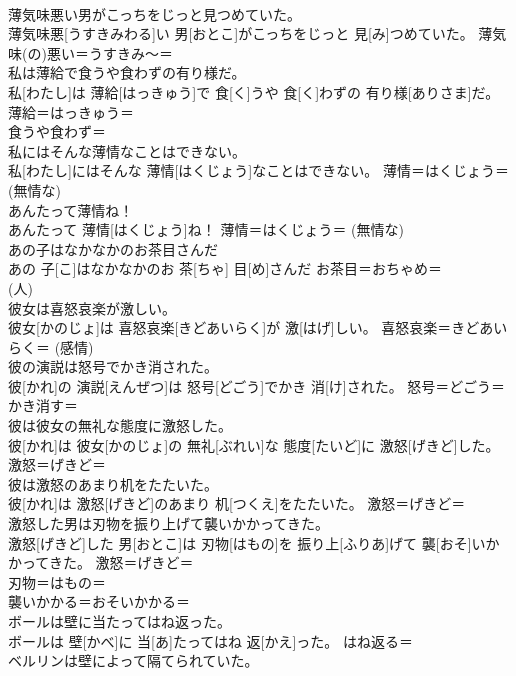 \documentclass[8pt]{extreport}
\begin{document}
\begin{CJK}{UTF8}{min}
{\\	薄気味悪い男がこっちをじっと見つめていた。	
\\	薄気味悪[うすきみわる]い 男[おとこ]がこっちをじっと 見[み]つめていた。	薄気味(の)悪い＝うすきみ〜＝ 
\\	私は薄給で食うや食わずの有り様だ。	
\\	私[わたし]は 薄給[はっきゅう]で 食[く]うや 食[く]わずの 有り様[ありさま]だ。	薄給＝はっきゅう＝ 
\\	食うや食わず＝ 
\\	私にはそんな薄情なことはできない。	
\\	私[わたし]にはそんな 薄情[はくじょう]なことはできない。	薄情＝はくじょう＝ (無情な) 
\\	あんたって薄情ね！	
\\	あんたって 薄情[はくじょう]ね！	薄情＝はくじょう＝ (無情な) 
\\	あの子はなかなかのお茶目さんだ	
\\	あの 子[こ]はなかなかのお 茶[ちゃ] 目[め]さんだ	お茶目＝おちゃめ＝ 
\\	(人) 
\\	彼女は喜怒哀楽が激しい。	
\\	彼女[かのじょ]は 喜怒哀楽[きどあいらく]が 激[はげ]しい。	喜怒哀楽＝きどあいらく＝ (感情) 
\\	彼の演説は怒号でかき消された。	
\\	彼[かれ]の 演説[えんぜつ]は 怒号[どごう]でかき 消[け]された。	怒号＝どごう＝ 
\\	かき消す＝ 
\\	彼は彼女の無礼な態度に激怒した。	
\\	彼[かれ]は 彼女[かのじょ]の 無礼[ぶれい]な 態度[たいど]に 激怒[げきど]した。	激怒＝げきど＝ 
\\	彼は激怒のあまり机をたたいた。	
\\	彼[かれ]は 激怒[げきど]のあまり 机[つくえ]をたたいた。	激怒＝げきど＝ 
\\	激怒した男は刃物を振り上げて襲いかかってきた。	
\\	激怒[げきど]した 男[おとこ]は 刃物[はもの]を 振り上[ふりあ]げて 襲[おそ]いかかってきた。	激怒＝げきど＝ 
\\	刃物＝はもの＝ 
\\	襲いかかる＝おそいかかる＝ 
\\	ボールは壁に当たってはね返った。	
\\	ボールは 壁[かべ]に 当[あ]たってはね 返[かえ]った。	はね返る＝ 
\\	ベルリンは壁によって隔てられていた。	
}
\end{CJK}
\end{document}
